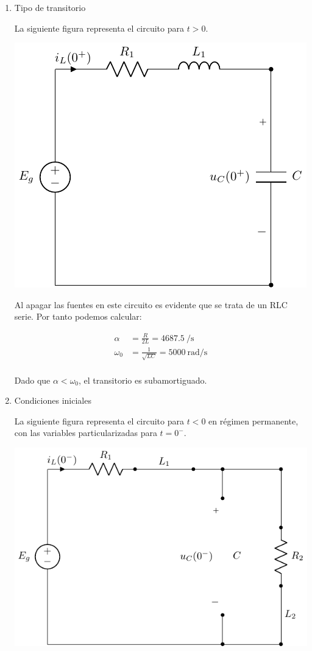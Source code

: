 \documentclass[12pt]{article}
\begin{document}
\begin{enumerate}

\item Tipo de transitorio

La siguiente figura representa el circuito para $t > 0$.

\includegraphics{figs/E1_RLC_0+.pdf}

Al apagar las fuentes en este circuito es evidente que se trata de un RLC serie. Por tanto podemos calcular:

\begin{align*}
  \alpha &= \frac{R}{2L} = \SI{4687.5}{\per\second}\\
  \omega_0 &= \frac{1}{\sqrt{LC}} = \SI{5000}{\radian\per\second}\\
\end{align*}

Dado que $\alpha < \omega_0$, el transitorio es subamortiguado.

\item Condiciones iniciales

  La siguiente figura representa el circuito para $t < 0$ en régimen permanente, con las variables particularizadas para $t = 0^-$.

  \includegraphics{figs/E1_RLC_0-.pdf}


\end{enumerate}
\end{document}
